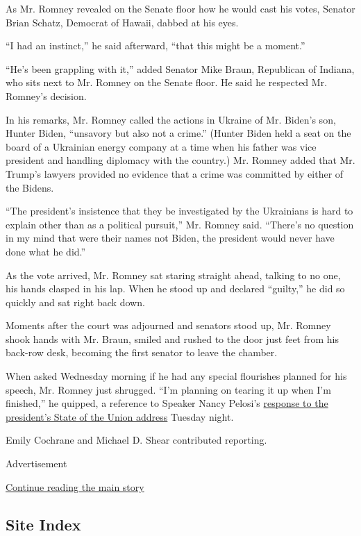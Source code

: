 As Mr. Romney revealed on the Senate floor how he would cast his votes,
Senator Brian Schatz, Democrat of Hawaii, dabbed at his eyes.

``I had an instinct,'' he said afterward, ``that this might be a
moment.''

``He's been grappling with it,'' added Senator Mike Braun, Republican of
Indiana, who sits next to Mr. Romney on the Senate floor. He said he
respected Mr. Romney's decision.

In his remarks, Mr. Romney called the actions in Ukraine of Mr. Biden's
son, Hunter Biden, ``unsavory but also not a crime.'' (Hunter Biden held
a seat on the board of a Ukrainian energy company at a time when his
father was vice president and handling diplomacy with the country.) Mr.
Romney added that Mr. Trump's lawyers provided no evidence that a crime
was committed by either of the Bidens.

``The president's insistence that they be investigated by the Ukrainians
is hard to explain other than as a political pursuit,'' Mr. Romney said.
``There's no question in my mind that were their names not Biden, the
president would never have done what he did.''

As the vote arrived, Mr. Romney sat staring straight ahead, talking to
no one, his hands clasped in his lap. When he stood up and declared
``guilty,'' he did so quickly and sat right back down.

Moments after the court was adjourned and senators stood up, Mr. Romney
shook hands with Mr. Braun, smiled and rushed to the door just feet from
his back-row desk, becoming the first senator to leave the chamber.

When asked Wednesday morning if he had any special flourishes planned
for his speech, Mr. Romney just shrugged. ``I'm planning on tearing it
up when I'm finished,'' he quipped, a reference to Speaker Nancy
Pelosi's
\href{https://www.nytimes3xbfgragh.onion/2020/02/05/us/politics/trump-pelosi.html}{response
to the president's State of the Union address} Tuesday night.

Emily Cochrane and Michael D. Shear contributed reporting.

Advertisement

\protect\hyperlink{after-bottom}{Continue reading the main story}

\hypertarget{site-index}{%
\subsection{Site Index}\label{site-index}}

